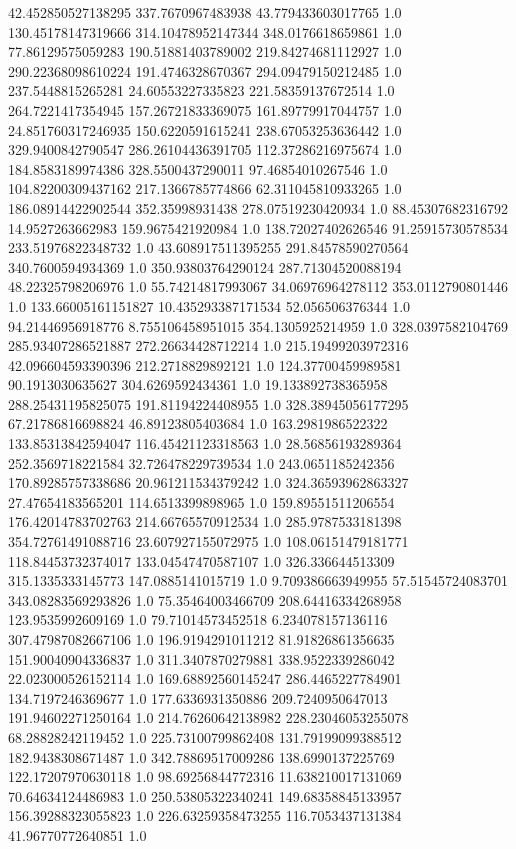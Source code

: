 42.452850527138295	337.7670967483938	43.779433603017765	1.0
130.45178147319666	314.10478952147344	348.0176618659861	1.0
77.86129575059283	190.51881403789002	219.84274681112927	1.0
290.22368098610224	191.4746328670367	294.09479150212485	1.0
237.5448815265281	24.60553227335823	221.58359137672514	1.0
264.7221417354945	157.26721833369075	161.89779917044757	1.0
24.851760317246935	150.6220591615241	238.67053253636442	1.0
329.9400842790547	286.26104436391705	112.37286216975674	1.0
184.8583189974386	328.5500437290011	97.46854010267546	1.0
104.82200309437162	217.1366785774866	62.311045810933265	1.0
186.08914422902544	352.35998931438	278.07519230420934	1.0
88.45307682316792	14.9527263662983	159.9675421920984	1.0
138.72027402626546	91.25915730578534	233.51976822348732	1.0
43.608917511395255	291.84578590270564	340.7600594934369	1.0
350.93803764290124	287.71304520088194	48.22325798206976	1.0
55.74214817993067	34.06976964278112	353.0112790801446	1.0
133.66005161151827	10.435293387171534	52.056506376344	1.0
94.21446956918776	8.755106458951015	354.1305925214959	1.0
328.0397582104769	285.93407286521887	272.26634428712214	1.0
215.19499203972316	42.096604593390396	212.2718829892121	1.0
124.37700459989581	90.1913030635627	304.6269592434361	1.0
19.133892738365958	288.25431195825075	191.81194224408955	1.0
328.38945056177295	67.21786816698824	46.89123805403684	1.0
163.2981986522322	133.85313842594047	116.45421123318563	1.0
28.56856193289364	252.3569718221584	32.726478229739534	1.0
243.0651185242356	170.89285757338686	20.961211534379242	1.0
324.36593962863327	27.47654183565201	114.6513399898965	1.0
159.89551511206554	176.42014783702763	214.66765570912534	1.0
285.9787533181398	354.72761491088716	23.607927155072975	1.0
108.06151479181771	118.84453732374017	133.04547470587107	1.0
326.336644513309	315.1335333145773	147.0885141015719	1.0
9.709386663949955	57.51545724083701	343.08283569293826	1.0
75.35464003466709	208.64416334268958	123.9535992609169	1.0
79.71014573452518	6.234078157136116	307.47987082667106	1.0
196.9194291011212	81.91826861356635	151.90040904336837	1.0
311.3407870279881	338.9522339286042	22.023000526152114	1.0
169.68892560145247	286.4465227784901	134.7197246369677	1.0
177.6336931350886	209.7240950647013	191.94602271250164	1.0
214.76260642138982	228.23046053255078	68.28828242119452	1.0
225.73100799862408	131.79199099388512	182.9438308671487	1.0
342.78869517009286	138.6990137225769	122.17207970630118	1.0
98.69256844772316	11.638210017131069	70.64634124486983	1.0
250.53805322340241	149.68358845133957	156.39288323055823	1.0
226.63259358473255	116.7053437131384	41.96770772640851	1.0
